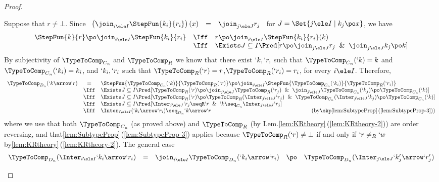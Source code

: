 \documentclass{CSML}
\begin{document}
\begin{proof}
\begin{description}
Suppose that $r \neq \bot$. 
Since
%
 $ \begin{array}{rcl}
 \left(\join_{i \ele I} \StepFun{k_i }{ r_i}\right)(x) &=& \join_{j \ele J}r_j 
 \end{array} $
for $J = \Set{j \ele I \mid k_j\po x}$, we have 
%
 \[ \begin{array}{lll}
 \StepFun{k }{ r} \po \join_{i \ele I} \StepFun{k_i }{ r_i} & \Iff &
r \po \join_{i \ele I} \StepFun{k_i }{ r_i}(k) \\ %
& \Iff & \Exists J \subseteq I \Pred[ r \po \join_{j \ele J}r_j \And \join_{j \ele J}k_j \po k ]
 \end{array} \]
By subjectivity of $\TypeToComp_{C_n}$ and $\TypeToComp_R$ we know that
there exist $`k,`r,$ such that $\TypeToComp_{C_n}(`k) = k$ and $\TypeToComp_{C_n}(`k_i) = k_i$,
and $`k_i,`r_i$ such that $\TypeToComp_R(`r) = r$,$\TypeToComp_{R}(`r_i) = r_i$, for every $i\ele I$. Therefore,
%
 \[ \begin{array}{lcll}
 \TypeToComp_{D_n}(`k\arrow `r) 
	& = & 
 \StepFun{\TypeToComp_{C_n}(`k) }{ \TypeToComp_R(`r)} \po 
 \join_{i \ele I} \StepFun{\TypeToComp_{C_n}(`k_i) }{ \TypeToComp_R(`r_i)} 
	\\ & \Iff & 
 \Exists J \subseteq I \Pred[ \TypeToComp_R(`r) \po \join_{j \ele J}\TypeToComp_R(`r_j) \And 
 \join_{j \ele J}\TypeToComp_{C_n}(`k_j) \po \TypeToComp_{C_n}(`k) ]
	\\ & \Iff & 
 \Exists J \subseteq I \Pred[ \TypeToComp_R(`r) \po \TypeToComp_R(\Inter_{j \ele J}`r_j) \And 
 \TypeToComp_{C_n}(\Inter_{j \ele J}`k_j) \po \TypeToComp_{C_n}(`k) ]
	\\ & \Iff & 
 \Exists J \subseteq I \Pred[ \Inter_{j \ele J}`r_j \seqR `r \And `k \seq_{C_n} \Inter_{j \ele J}`r_j ]
	\\ & \Iff & 
 \Inter_{i \ele I} (`k_i\arrow `r_i) \seq_{D_n} `k\arrow `r 
	\hfill \textrm{(by\skp\ref{lem:SubtypeProp}\,(\ref{lem:SubtypeProp-3}))}
 \end{array} \]
where we use that both $\TypeToComp_{C_n}$ (as proved above) and $\TypeToComp_R$ (by Lem.\skp\ref{lem:KRtheory}\,(\ref{lem:KRtheory-2})) are order reversing, and that\skp\ref{lem:SubtypeProp}\,(\ref{lem:SubtypeProp-3}) applies because $\TypeToComp_R(`r) \neq \bot$ if and only if $`r \neq_R `w$ by\skp\ref{lem:KRtheory}\,(\ref{lem:KRtheory-2}).
%
The general case 
%
 \[ \begin{array}{rcl@{\quad}lc}
 \TypeToComp_{D_n}(\Inter_{i \ele I}`k_i\arrow `r_i) 
	&=& 
 \join_{i \ele I}\TypeToComp_{D_n}(`k_i\arrow `r_i)
	&\po& 
 \TypeToComp_{D_n}(\Inter_{j \ele J}`k'_j\arrow `r'_j) 

\end{array}\]
\end{description}
\end{proof}
\end{document}

